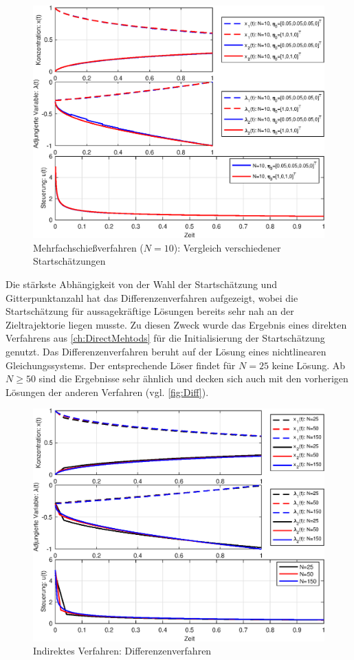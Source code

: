 \begin{figure}[h!]
	\centering
	\includegraphics[width=.75\textwidth]{images/MultipleShoot_StartschaetzungVergleich_Result}
		\caption{Mehrfachschießverfahren ($N=10$): Vergleich verschiedener Startschätzungen}
	\label{fig:CompareMehrfach}
\end{figure}

Die stärkste Abhängigkeit von der Wahl der Startschätzung und Gitterpunktanzahl hat das Differenzenverfahren aufgezeigt, wobei die Startschätzung für aussagekräftige Lösungen bereits sehr nah an der Zieltrajektorie liegen musste. Zu diesen Zweck wurde das Ergebnis eines direkten Verfahrens aus \autoref{ch:DirectMehtods} für die Initialisierung der Startschätzung genutzt. Das Differenzenverfahren beruht auf der Lösung eines nichtlinearen Gleichungssystems. Der entsprechende Löser findet für $N=25$ keine Lösung. Ab $N\geq50$ sind die Ergebnisse sehr ähnlich und decken sich auch mit den vorherigen Lösungen der anderen Verfahren (vgl. \autoref{fig:Diff}).

\begin{figure}[h!]
	\centering
	\includegraphics[width=.85\textwidth]{images/FiniteDiff_Result}
	\caption{Indirektes Verfahren: Differenzenverfahren}
	\label{fig:Diff}
\end{figure}

